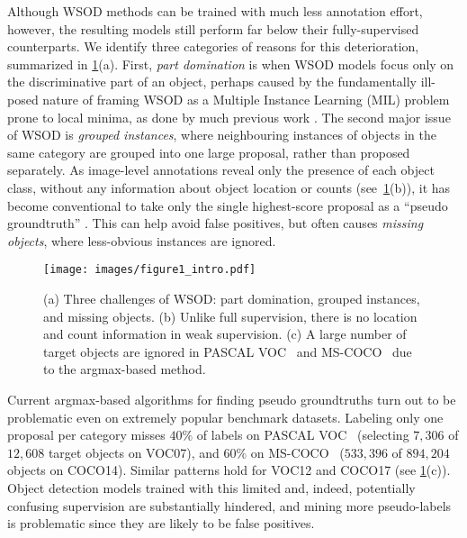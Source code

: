 \documentclass[runningheads]{llncs}
\begin{document}
Although WSOD methods can be trained with much less annotation effort, however, the resulting models still perform far below their fully-supervised counterparts.
We identify three categories of reasons for this deterioration, summarized in \cref{fig:figure1}(a).
First, \emph{part domination} is when WSOD models focus only on the discriminative part of an object,
perhaps caused by the fundamentally ill-posed nature of framing WSOD as a Multiple Instance Learning (MIL) problem \cite{dietterich1997solving} prone to local minima,
as done by much previous work \cite{Bilen_2016_CVPR,Tang_2017_CVPR,Wan_2019_CVPR}.
The second major issue of WSOD is \emph{grouped instances},
where 
neighbouring instances of objects in the same category are grouped into one large proposal, rather than proposed separately.
As image-level annotations reveal only the presence of each object class, without any information about object location or counts (see~\cref{fig:figure1}(b)), it has become conventional to take only the single highest-score proposal as a ``pseudo groundtruth'' \cite{Bilen_2016_CVPR,Tang_2017_CVPR,huang2020comprehensive}.
This can help avoid false positives,
but
often causes \emph{missing objects}, where less-obvious instances are ignored. 

\begin{figure}[t!]
\centering
\texttt{[image: images/figure1\_intro.pdf]}
\caption{(a) Three challenges of WSOD: part domination, grouped instances, and missing objects. (b) Unlike full supervision, there is no location and count information in weak supervision. (c) A large number of target objects are ignored in PASCAL VOC~\cite{Everingham15} and MS-COCO~\cite{lin2014microsoft} due to the argmax-based method.}
\label{fig:figure1}
\end{figure}

Current argmax-based algorithms for finding pseudo groundtruths turn out to be problematic even on extremely popular benchmark datasets.
Labeling only one proposal per category misses $40\%$ of labels on PASCAL VOC~\cite{Everingham15} (selecting $7{,}306$ of $12{,}608$ target objects on VOC07),
and $60\%$ on MS-COCO~\cite{lin2014microsoft} ($533{,}396$ of $894{,}204$ objects on COCO14).
Similar patterns hold for VOC12 and COCO17 (see \cref{fig:figure1}(c)).
Object detection models trained with this limited and, indeed, potentially confusing supervision are substantially hindered,
and mining more pseudo-labels is problematic since they are likely to be false positives.
\end{document}
